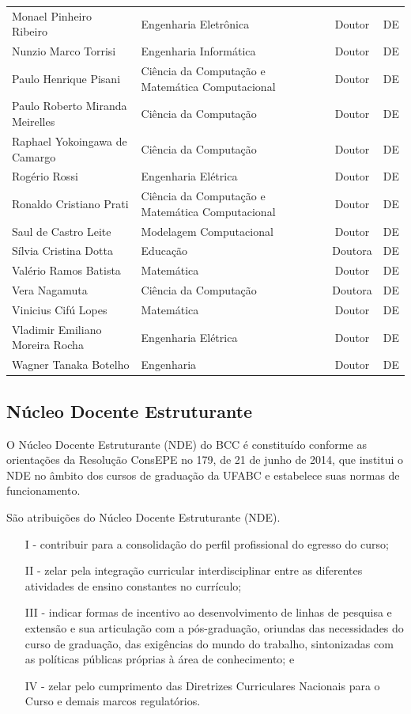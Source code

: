 \documentclass{article}
\begin{document}
\begin{longtable}{|l|l|c|c|}
Monael Pinheiro Ribeiro & Engenharia Eletrônica & Doutor & DE \\
Nunzio Marco Torrisi & Engenharia Informática & Doutor & DE \\
Paulo Henrique Pisani & Ciência da Computação e Matemática Computacional & Doutor & DE \\
Paulo Roberto Miranda Meirelles & Ciência da Computação & Doutor & DE \\
Raphael Yokoingawa de Camargo & Ciência da Computação & Doutor & DE \\
Rogério Rossi & Engenharia Elétrica & Doutor & DE \\
Ronaldo Cristiano Prati & Ciência da Computação e Matemática Computacional & Doutor & DE \\
Saul de Castro Leite & Modelagem Computacional & Doutor & DE \\
Sílvia Cristina Dotta & Educação & Doutora & DE \\
Valério Ramos Batista & Matemática & Doutor & DE \\
Vera Nagamuta & Ciência da Computação & Doutora & DE \\
Vinicius Cifú Lopes & Matemática & Doutor & DE \\
Vladimir Emiliano Moreira Rocha & Engenharia Elétrica & Doutor & DE \\
Wagner Tanaka Botelho & Engenharia & Doutor & DE \\
\hline

\end{longtable}


\subsection{Núcleo Docente Estruturante}

O Núcleo Docente Estruturante (NDE) do BCC é constituído conforme as orientações da Resolução ConsEPE no 179, de 21 de junho de 2014, que institui o NDE no âmbito dos cursos 
de graduação da UFABC e estabelece suas normas de funcionamento. 

São atribuições do Núcleo Docente Estruturante (NDE).

\begin{enumerate}
\item [I -] contribuir para a consolidação do perfil profissional do egresso do curso;
\item [II -] zelar pela integração curricular interdisciplinar entre as diferentes atividades de ensino
constantes no currículo;
\item [III -] indicar formas de incentivo ao desenvolvimento de linhas de pesquisa e extensão e sua
articulação com a pós-graduação, oriundas das necessidades do curso de graduação, das
exigências do mundo do trabalho, sintonizadas com as políticas públicas próprias à área de
conhecimento; e
\item [IV -] zelar pelo cumprimento das Diretrizes Curriculares Nacionais para o Curso e demais
marcos regulatórios.
\end{enumerate}
\end{document}
